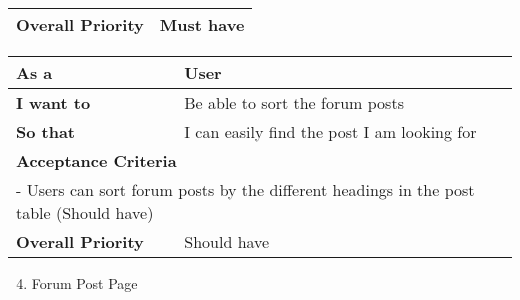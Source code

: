 \begin{table}[h!]
\begin{tabular}{|ll|}
    \multicolumn{1}{|l|}{\textbf{Overall Priority}}                                                                                                                                                                          & Must have                                                                                                                                                                                                           \\ \hline
    \end{tabular}
\end{table}

\begin{table}[h!]
    \begin{tabular}{|ll|}
    \hline
    \multicolumn{1}{|l|}{\textbf{As a}}              & User                                        \\ \hline
    \multicolumn{1}{|l|}{\textbf{I want to}}         & Be able to sort the forum posts             \\ \hline
    \multicolumn{1}{|l|}{\textbf{So that}}           & I can easily find the post I am looking for \\ \hline
    \multicolumn{2}{|l|}{\textbf{Acceptance Criteria}}                                             \\ \hline
    \multicolumn{2}{|l|}{- Users can sort forum posts by the different headings in the post table (Should have)} \\ \hline
    \multicolumn{1}{|l|}{\textbf{Overall Priority}}  & Should have                                 \\ \hline
    \end{tabular}
\end{table}

\begin{enumerate}
    \setcounter{enumi}{3}
    \item Forum Post Page
\end{enumerate}

